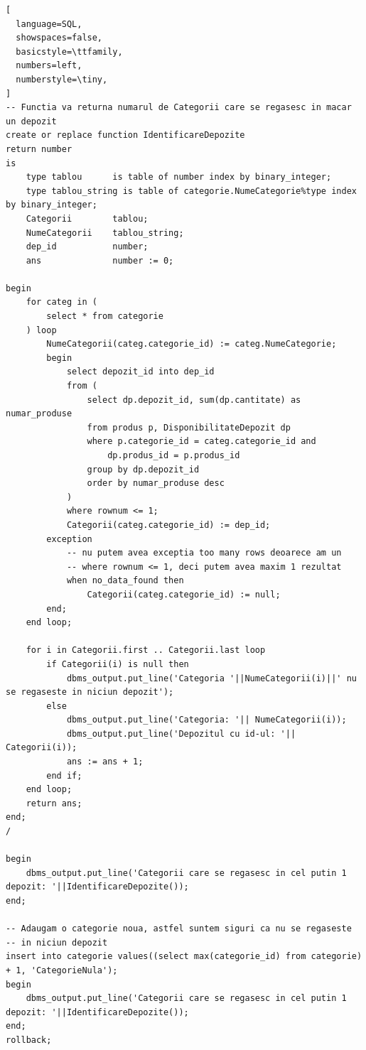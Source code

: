 \documentclass[12pt]{article}
\begin{document}
\begin{lstlisting}[
  language=SQL,
  showspaces=false,
  basicstyle=\ttfamily,
  numbers=left,
  numberstyle=\tiny,
]
-- Functia va returna numarul de Categorii care se regasesc in macar un depozit
create or replace function IdentificareDepozite
return number
is
    type tablou      is table of number index by binary_integer;
    type tablou_string is table of categorie.NumeCategorie%type index by binary_integer;
    Categorii        tablou;
    NumeCategorii    tablou_string;
    dep_id           number;
    ans              number := 0;
    
begin
    for categ in (
        select * from categorie
    ) loop
        NumeCategorii(categ.categorie_id) := categ.NumeCategorie;
        begin
            select depozit_id into dep_id
            from (
                select dp.depozit_id, sum(dp.cantitate) as numar_produse
                from produs p, DisponibilitateDepozit dp
                where p.categorie_id = categ.categorie_id and
                    dp.produs_id = p.produs_id
                group by dp.depozit_id
                order by numar_produse desc                    
            )
            where rownum <= 1;
            Categorii(categ.categorie_id) := dep_id;
        exception
            -- nu putem avea exceptia too many rows deoarece am un
            -- where rownum <= 1, deci putem avea maxim 1 rezultat
            when no_data_found then
                Categorii(categ.categorie_id) := null;
        end;
    end loop;
    
    for i in Categorii.first .. Categorii.last loop
        if Categorii(i) is null then
            dbms_output.put_line('Categoria '||NumeCategorii(i)||' nu se regaseste in niciun depozit');
        else
            dbms_output.put_line('Categoria: '|| NumeCategorii(i));
            dbms_output.put_line('Depozitul cu id-ul: '|| Categorii(i));
            ans := ans + 1;
        end if;
    end loop;
    return ans;
end;
/

begin
    dbms_output.put_line('Categorii care se regasesc in cel putin 1 depozit: '||IdentificareDepozite());
end;

-- Adaugam o categorie noua, astfel suntem siguri ca nu se regaseste
-- in niciun depozit
insert into categorie values((select max(categorie_id) from categorie) + 1, 'CategorieNula');
begin
    dbms_output.put_line('Categorii care se regasesc in cel putin 1 depozit: '||IdentificareDepozite());
end;
rollback;
\end{lstlisting}
\end{document}
